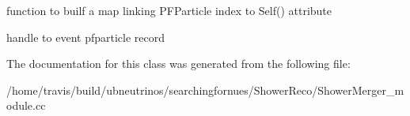 function to builf a map linking P\+F\+Particle index to Self() attribute 

handle to event pfparticle record 

The documentation for this class was generated from the following file\+:\begin{DoxyCompactItemize}
\item 
/home/travis/build/ubneutrinos/searchingfornues/\+Shower\+Reco/Shower\+Merger\+\_\+module.\+cc\end{DoxyCompactItemize}
